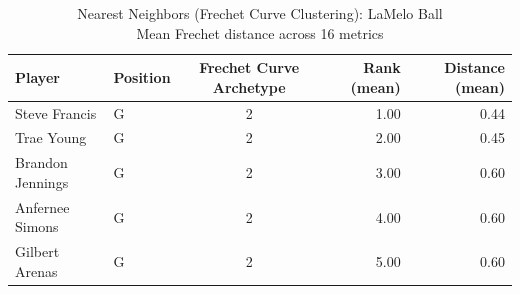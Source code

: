 \begin{table}[t]
\caption*{
{\fontsize{20}{25} Nearest Neighbors (Frechet Curve Clustering): LaMelo Ball\fontsize{12}{15}\selectfont } \\ 
{\fontsize{14}{17}\selectfont  Mean Frechet distance across 16 metrics\fontsize{12}{15}\selectfont }
} 
\fontsize{12.0pt}{14.0pt}\selectfont
\begin{tabular*}{\linewidth}{@{\extracolsep{\fill}}llcrr}
\toprule
Player & Position & Frechet Curve Archetype & Rank (mean) & Distance (mean) \\ 
\midrule\addlinespace[2.5pt]
Steve Francis & G & 2 & 1.00 & 0.44 \\ 
Trae Young & G & 2 & 2.00 & 0.45 \\ 
Brandon Jennings & G & 2 & 3.00 & 0.60 \\ 
Anfernee Simons & G & 2 & 4.00 & 0.60 \\ 
Gilbert Arenas & G & 2 & 5.00 & 0.60 \\ 
\bottomrule
\end{tabular*}
\end{table}

